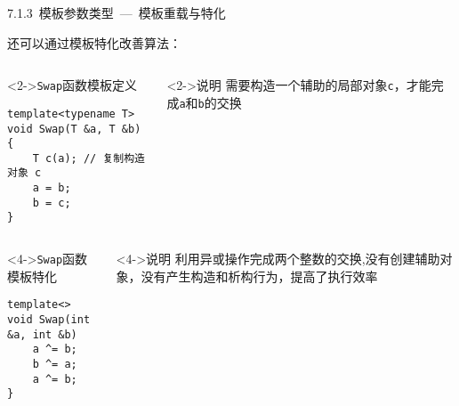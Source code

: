\begin{frame}[fragile]{7.1.3~模板参数类型\normalsize{~---~模板重载与特化}}

还可以通过模板特化改善算法：

\vspace{-4mm}

\begin{columns}[t]

\begin{blueblock}<2->{\texttt{Swap}函数模板定义}
\vspace{-2.5mm}\begin{lstlisting}[moreemph={T}]
template<typename T>
void Swap(T &a, T &b) {
    T c(a); // 复制构造对象 c
    a = b;
    b = c;
}
\end{lstlisting}\vspace{-2mm}
\end{blueblock}

\begin{yellowblock}<2->{说明}
需要构造一个辅助的局部对象\texttt{c}，才能完成\texttt{a}和\texttt{b}的交换
\end{yellowblock}

\end{columns}

\vspace{4mm}


\vspace{-4mm}

\begin{columns}[t]

\begin{blueblock}<4->{\texttt{Swap}函数模板特化}
\vspace{-2.5mm}\begin{lstlisting}[moreemph={T}]
template<>
void Swap(int &a, int &b)
    a ^= b;
    b ^= a;
    a ^= b;
}
\end{lstlisting}\vspace{-2mm}
\end{blueblock}

\begin{yellowblock}<4->{说明}
利用异或操作完成两个整数的交换,没有创建辅助对象，没有产生构造和析构行为，提高了执行效率
\end{yellowblock}

\end{columns}

\end{frame}

